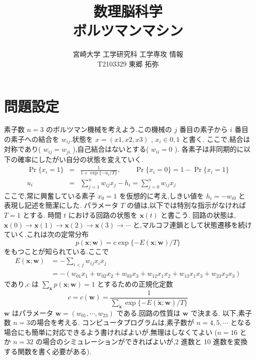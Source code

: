 \documentclass[a4j, uplatex, fleqn, dvipdfmx]{jsarticle} %
\title{\vspace{-1.5cm}数理脳科学\\ボルツマンマシン}
\author{宮崎大学 工学研究科 工学専攻 情報\\T2103329 東郷 拓弥}
\begin{document}
\maketitle
\section{問題設定}
素子数 $n = 3$ のボルツマン機械を考えよう.この機械の $j$ 番目の素子から $i$ 番目の素子への結合を
 $w_{ij}$.状態を $x = (x1, x2,x3)$ , $x_i \in {0, 1}$ と書く. 
ここで,結合は対称であり( $w_{ij} = w_{ji}$ ),自己結合はないとする( $w_{ii} = 0$ ).
各素子は非同期的に以下の確率にしたがい自分の状態を変えていく.
\begin{eqnarray}
  \label{eq:excitement_dynamics}
  \operatorname{Pr}\{x_i = 1\} & = & \frac{1}{1 + \exp \{-u_i / T\}}, \qquad \operatorname{Pr}\{x_i = 0\} = 1 - \operatorname{Pr}\{x_i = 1\} \\
  u_i & = & \sum_{j=1}^n w_{ij} x_j - h_i = \sum_{j=0}^n w_{ij} x_j
\end{eqnarray}
ここで,常に興奮している素子 $x_0 = 1$ を仮想的に考え,しきい値を $h_i = −w_{i0}$ と表現し記述を簡潔にした.
パラメータ $T$ の値は,以下では特別な指示がなければ $T = 1$ とする.
時間 $t$ における回路の状態を $\bm{x}(t)$ と書こう. 回路の状態は,
$ \bm{x}(0) \rightarrow \bm{x}(1) \rightarrow \bm{x}(2) \rightarrow \bm{x}(3) \rightarrow \cdots $
と,マルコフ連鎖として状態遷移を続けていく.これは次の定常分布
\begin{equation}
  \label{eq:stationary_distribution}
  p(\bm{x} ; \bm{w}) = c \exp \{-E(\bm{x} ; \bm{w}) / T\}
\end{equation}
をもつことが知られている.ここで
\begin{align}
  E(\bm{x} ; \bm{w}) &=-\sum_{i<j} w_{i j} x_{i} x_{j} \\
  &=-\left(w_{01} x_{1}+w_{02} x_{2}+w_{03} x_{3}+w_{12} x_{1} x_{2}+w_{13} x_{1} x_{3}+w_{23} x_{2} x_{3}\right)
\end{align}
であり,$c$ は $\sum_{\bm{x}} p(\bm{x}; \bm{w}) = 1$ とするための正規化定数
\begin{equation}
  c = c(\bm{w}) = \frac{1}{\sum_{\tilde{\bm{x}}} \exp \{-E(\tilde{\bm{x}} ; \bm{w}) / T\}}
\end{equation}
$\bm{w}$ はパラメータ $\bm{w} = (w_{01}, \cdots , w_{23})$ である.回路の性質は $\bm{w}$ で決まる.
以下,素子数 $n = 3$の場合を考える.
コンピュータプログラムは,素子数が $n = 4, 5, \cdots$ となる場合にも簡単に対応できるよう書ければよいが,無理はしなくてよい
($n = 16$ とか $n = 32$ の場合のシミュレーションができればよいが,2 進数と 10 進数を変換する関数を書く必要がある).
\end{document}
